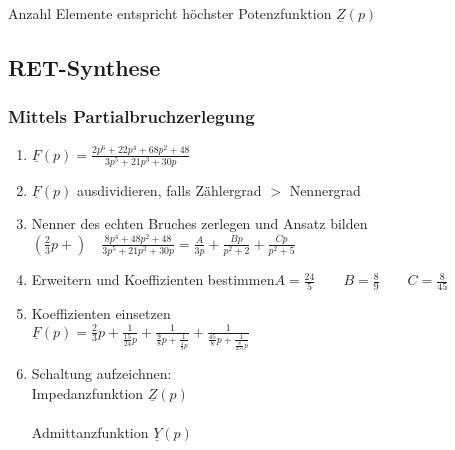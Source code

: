 	Anzahl Elemente entspricht höchster Potenzfunktion $\underline{Z}(p)$
	
\subsection{RET-Synthese}
\begin{multicols}{2}
\subsubsection{Mittels Partialbruchzerlegung}
	\begin{enumerate}
	  \item $\underline{F}(p)=\frac{2p^6+22p^4+68p^2+48}{3p^5+21p^3+30p}$
	  \item $\underline{F}(p)$ ausdividieren, falls Zählergrad $>$ Nennergrad
	  \item Nenner des echten Bruches zerlegen und Ansatz bilden
	  $(\frac{2}{3}p+)
	  \quad\frac{8p^4+48p^2+48}{3p^5+21p^3+30p}=\frac{A}{3p}+\frac{Bp}{p^2+2}+\frac{Cp}{p^2+5}$
		\item Erweitern und Koeffizienten bestimmen\newline $A=\frac{24}{5} \qquad
		B=\frac{8}{9} \qquad C=\frac{8}{45}$
		\item Koeffizienten einsetzen\\
		$\underline{F}(p)=\frac{2}{3}p+\frac{1}{\frac{15}{24}p}+\frac{1}{\frac{9}{8}p+\frac{1}{\frac{4}{9}p}}+\frac{1}{\frac{45}{8}p+\frac{1}{\frac{8}{255}p}}$
		\item Schaltung aufzeichnen:\\
			Impedanzfunktion $\underline{Z}(p)$\\
			\hspace*{0.5cm}\scalebox{0.6}{}\\
			Admittanzfunktion $\underline{Y}(p)$\\
			\hspace*{0.5cm}\scalebox{0.55}{}	  
	\end{enumerate}
	

\end{multicols}
